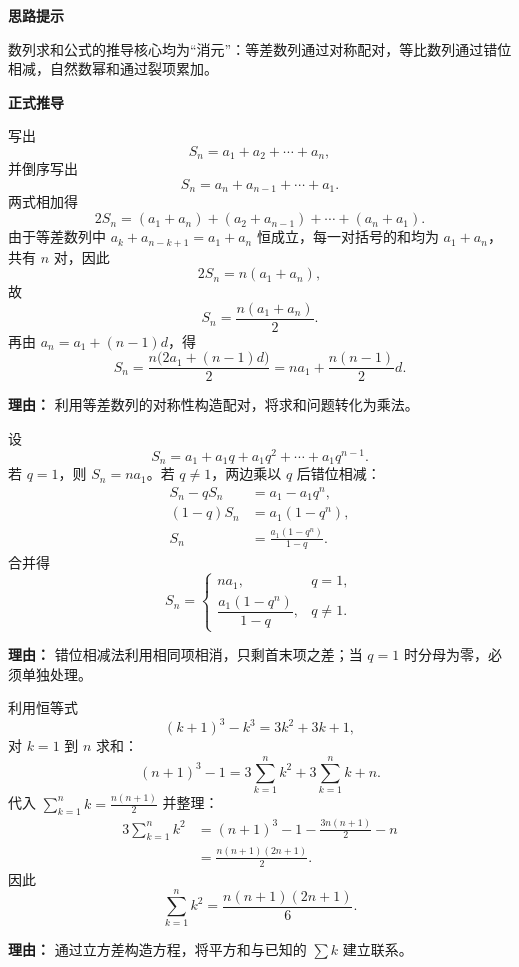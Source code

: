 \begin{proofbox}
	\textbf{\textcolor{CProof}{思路提示}}

	数列求和公式的推导核心均为“消元”：等差数列通过对称配对，等比数列通过错位相减，自然数幂和通过裂项累加。

	\medskip
	\textbf{\textcolor{CProof}{正式推导}}
	\begin{description}[style=nextline, leftmargin=2.8em, labelsep=0.5em, itemsep=0.55em]
		\item[\textbf{步骤一（等差倒序）：}]
		      写出
		      \[
			      S_n=a_1+a_2+\cdots+a_n,
		      \]
		      并倒序写出
		      \[
			      S_n=a_n+a_{n-1}+\cdots+a_1.
		      \]
		      两式相加得
		      \[
			      2S_n=(a_1+a_n)+(a_2+a_{n-1})+\cdots+(a_n+a_1).
		      \]
		      由于等差数列中 \(a_k+a_{n-k+1}=a_1+a_n\) 恒成立，每一对括号的和均为 \(a_1+a_n\)，共有 \(n\) 对，因此
		      \[
			      2S_n=n(a_1+a_n),
		      \]
		      故
		      \[
			      S_n=\frac{n(a_1+a_n)}{2}.
		      \]
		      再由 \(a_n=a_1+(n-1)d\)，得
		      \[
			      S_n=\frac{n\bigl(2a_1+(n-1)d\bigr)}{2}
			      =na_1+\frac{n(n-1)}{2}d.
		      \]
		      \par\textbf{理由：} 利用等差数列的对称性构造配对，将求和问题转化为乘法。

		\item[\textbf{步骤二（等比错位）：}]
		      设
		      \[
			      S_n=a_1+a_1q+a_1q^2+\cdots+a_1q^{n-1}.
		      \]
		      若 \(q=1\)，则 \(S_n=na_1\)。若 \(q\neq1\)，两边乘以 \(q\) 后错位相减：
		      \[
			      \begin{aligned}
				      S_n-qS_n & = a_1-a_1q^n,             \\
				      (1-q)S_n & = a_1(1-q^n),             \\
				      S_n      & = \frac{a_1(1-q^n)}{1-q}.
			      \end{aligned}
		      \]
		      合并得
		      \[
			      S_n=
			      \begin{cases}
				      na_1,                    & q=1,    \\[4pt]
				      \dfrac{a_1(1-q^n)}{1-q}, & q\neq1.
			      \end{cases}
		      \]
		      \par\textbf{理由：} 错位相减法利用相同项相消，只剩首末项之差；当 \(q=1\) 时分母为零，必须单独处理。

		\item[\textbf{步骤三（平方和裂项）：}]
		      利用恒等式
		      \[
			      (k+1)^3-k^3=3k^2+3k+1,
		      \]
		      对 \(k=1\) 到 \(n\) 求和：
		      \[
			      (n+1)^3-1=3\sum_{k=1}^{n}k^2+3\sum_{k=1}^{n}k+n.
		      \]
		      代入 \(\sum_{k=1}^{n}k=\frac{n(n+1)}{2}\) 并整理：
		      \[
			      \begin{aligned}
				      3\sum_{k=1}^{n}k^2
				       & =(n+1)^3-1-\frac{3n(n+1)}{2}-n \\
				       & =\frac{n(n+1)(2n+1)}{2}.
			      \end{aligned}
		      \]
		      因此
		      \[
			      \sum_{k=1}^{n}k^2=\frac{n(n+1)(2n+1)}{6}.
		      \]
		      \par\textbf{理由：} 通过立方差构造方程，将平方和与已知的 \(\sum k\) 建立联系。


\end{description}
\end{proofbox}
